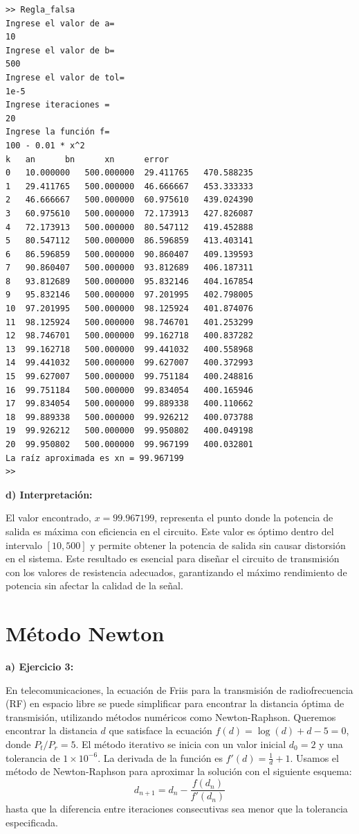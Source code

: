 \documentclass[12pt,a4paper,twoside]{article}  %
\begin{document}
\begin{verbatim}
>> Regla_falsa
Ingrese el valor de a= 
10
Ingrese el valor de b= 
500
Ingrese el valor de tol= 
1e-5
Ingrese iteraciones = 
20
Ingrese la función f=
100 - 0.01 * x^2
k	an		bn		xn		error
0	10.000000	500.000000	29.411765	470.588235
1	29.411765	500.000000	46.666667	453.333333
2	46.666667	500.000000	60.975610	439.024390
3	60.975610	500.000000	72.173913	427.826087
4	72.173913	500.000000	80.547112	419.452888
5	80.547112	500.000000	86.596859	413.403141
6	86.596859	500.000000	90.860407	409.139593
7	90.860407	500.000000	93.812689	406.187311
8	93.812689	500.000000	95.832146	404.167854
9	95.832146	500.000000	97.201995	402.798005
10	97.201995	500.000000	98.125924	401.874076
11	98.125924	500.000000	98.746701	401.253299
12	98.746701	500.000000	99.162718	400.837282
13	99.162718	500.000000	99.441032	400.558968
14	99.441032	500.000000	99.627007	400.372993
15	99.627007	500.000000	99.751184	400.248816
16	99.751184	500.000000	99.834054	400.165946
17	99.834054	500.000000	99.889338	400.110662
18	99.889338	500.000000	99.926212	400.073788
19	99.926212	500.000000	99.950802	400.049198
20	99.950802	500.000000	99.967199	400.032801
La raíz aproximada es xn = 99.967199
>>  

\end{verbatim}

\textbf{d) Interpretación:}

El valor encontrado, \( x = 99.967199 \), representa el punto donde la potencia de salida es máxima con eficiencia en el circuito. Este valor es óptimo dentro del intervalo \([10,500]\) y permite obtener la potencia de salida sin causar distorsión en el sistema. Este resultado es esencial para diseñar el circuito de transmisión con los valores de resistencia adecuados, garantizando el máximo rendimiento de potencia sin afectar la calidad de la señal.



\section{Método Newton}

\textbf{a) Ejercicio 3: }

En telecomunicaciones, la ecuación de Friis para la transmisión de radiofrecuencia (RF) en espacio libre se puede simplificar para encontrar la distancia óptima de transmisión, utilizando métodos numéricos como Newton-Raphson. Queremos encontrar la distancia \( d \) que satisface la ecuación \( f(d) = \log(d) + d - 5 = 0 \), donde \( P_t/P_r = 5 \). El método iterativo se inicia con un valor inicial \( d_0 = 2 \) y una tolerancia de \( 1 \times 10^{-6} \). La derivada de la función es \( f'(d) = \frac{1}{d} + 1 \). Usamos el método de Newton-Raphson para aproximar la solución con el siguiente esquema: 
\[
d_{n+1} = d_n - \frac{f(d_n)}{f'(d_n)}
\]
hasta que la diferencia entre iteraciones consecutivas sea menor que la tolerancia especificada.
\end{document}
